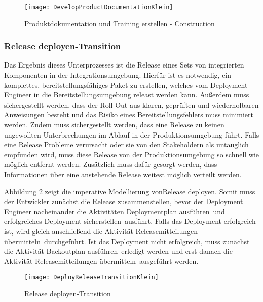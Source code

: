 \begin{figure}[!htbp]
\begin{center}
  \texttt{[image: DevelopProductDocumentationKlein]} %
  \caption{Produktdokumentation und Training erstellen - Construction}
  \label{fig:DevelopProductDocumentationKlein}
\end{center}
\end{figure}


\subsubsection{Release deployen-Transition}


Das Ergebnis dieses Unterprozesses ist die Release eines Sets von integrierten Komponenten in der Integrationsumgebung. Hierfür ist es notwendig, ein komplettes, bereitstellungsfähiges Paket zu erstellen, welches vom Deployment Engineer in die Bereitstellungsumgebung releast werden kann.
 Außerdem muss sichergestellt werden, dass der Roll-Out aus klaren, geprüften und wiederholbaren Anweisungen besteht und das Risiko eines Bereitstellungsfehlers muss minimiert werden.
 Zudem muss sichergestellt werden, dass eine Release zu keinen ungewollten Unterbrechungen im Ablauf in der Produktionsumgebung führt. Falls eine Release Probleme verursacht oder sie von den Stakeholdern als untauglich empfunden wird, muss diese Release von der Produktionsumgebung so schnell wie möglich entfernt werden. Zusätzlich muss dafür gesorgt werden, dass Informationen über eine anstehende Release weitest möglich verteilt werden.\newline
 
  Abbildung \ref{fig:DeployReleaseTransitionKlein} zeigt die imperative Modellierung von\grqq Release deployen\grqq.
  Somit muss der Entwickler zunächst die \grqq Release zusammenstellen\grqq, bevor der Deployment Engineer nacheinander die Aktivitäten \grqq Deploymentplan ausführen\grqq \ und \grqq erfolgreiches Deployment sicherstellen\grqq \ ausführt. Falls das Deployment erfolgreich ist, wird gleich anschließend die Aktivität \grqq Releasemitteilungen übermitteln\grqq \ durchgeführt. Ist das Deployment nicht erfolgreich, muss zunächst die Aktivität \grqq Backoutplan ausführen\grqq \ erledigt werden und erst danach die Aktivität \grqq Releasemitteilungen übermitteln\grqq \ ausgeführt werden.


\begin{figure}[!htbp]
\begin{center}
  \texttt{[image: DeployReleaseTransitionKlein]} %
  \caption{Release deployen-Transition}
  \label{fig:DeployReleaseTransitionKlein}
\end{center}
\end{figure}



